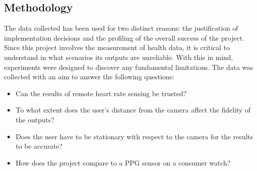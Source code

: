 \subsection{Methodology}
The data collected has been used for two distinct reasons: the justification of implementation decisions and the profiling of the overall success of the project.
Since this project involves the measurement of health data, it is critical to understand in what scenarios its outputs are unreliable.
With this in mind, experiments were designed to discover any fundamental limitations. The data was collected with an aim to answer the following questions:
\begin{itemize}
    \item Can the results of remote heart rate sensing be trusted?
    \item To what extent does the user's distance from the camera affect the fidelity of the outputs?
    \item Does the user have to be stationary with respect to the camera for the results to be accurate?
    \item How does the project compare to a PPG sensor on a consumer watch?
\end{itemize}

